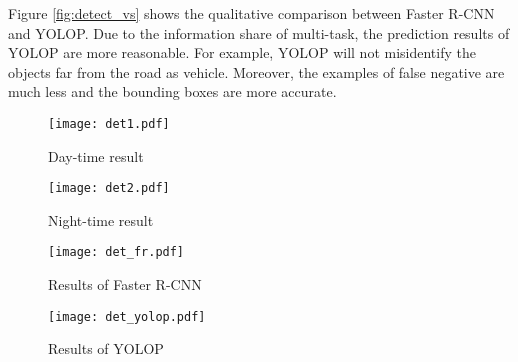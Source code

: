 \documentclass[10pt,twocolumn,letterpaper]{article}
\begin{document}
Figure \ref{fig:detect_vs} shows the qualitative comparison between Faster R-CNN and YOLOP. Due to the information share of multi-task, the prediction results of YOLOP are more reasonable. For example, YOLOP will not misidentify the objects far from the road as vehicle. Moreover, the examples of false negative are much less and the bounding boxes are more accurate.



\begin{figure*}
\centering
\begin{subfigure}{\linewidth}
  \texttt{[image: det1.pdf]}
  \caption{Day-time result}
\end{subfigure}

\begin{subfigure}{\linewidth}
  \texttt{[image: det2.pdf]}
  \caption{Night-time result}
\end{subfigure}
\caption{Visualization of the traffic objects detection results of YOLOP. Top Row: Traffic objects detection results in day-time scenes. Bottom row: Traffic objects detection results in night scenes.}
\label{fig:detect}
\end{figure*}

\begin{figure*}
\centering
\begin{subfigure}{\linewidth}
  \texttt{[image: det\_fr.pdf]}
  \caption{Results of Faster R-CNN}
\end{subfigure}

\begin{subfigure}{\linewidth}
  \texttt{[image: det\_yolop.pdf]}
  \caption{Results of YOLOP}
\end{subfigure}
\caption{Comparison between the traffic objects detection results of Faster R-CNN and YOLOP. Top Row: Traffic objects detection results of Faster R-CNN. Bottom row: Traffic objects detection results of YOLOP. The green bounding boxes are the detected correct vehicles. The yellow dotted bounding boxes are the false negative. The red  bounding boxes indicate the false positive.}
\label{fig:detect_vs}
\end{figure*}


\begin{table}
\begin{center}
\end{center}
\caption{Traffic Object Detection Results: comparing the proposed YOLOP with state-of-the-art detectors.}
\label{table:det_result}
\end{table}
\end{document}
